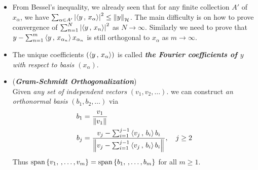 \documentclass[11pt]{article}
\begin{document}
\begin{itemize}
\item \begin{remark}
From Bessel's inequality, we already seen that for any finite collection $A'$ of $x_{\alpha}$, we have $\sum_{\alpha \in A'}\left\lvert \left\langle y\,,\, x_{\alpha} \right\rangle \right\rvert^2 \le \left\|y\right\|_{{\mathcal H}}$. The main difficulty is on how to prove convergence of $\sum_{n=1}^{N}\left\lvert \left\langle y\,,\, x_{n} \right\rangle \right\rvert^2 $ as $N\rightarrow \infty$. Similarly we need to prove that $y-  \sum_{n=1}^{m}\left\langle y\,,\, x_{\alpha_n} \right\rangle x_{\alpha_n}$ is still orthogonal to $x_{\alpha}$ as $m \rightarrow \infty$. 
\end{remark}

\item \begin{remark}
The unique coefficients $(\left\langle y\,,\, x_{\alpha} \right\rangle)$ is called \emph{\textbf{the Fourier coefficients of $y$} with respect to basis $(x_{\alpha})$}.
\end{remark}

\item \begin{remark} (\emph{\textbf{Gram-Schmidt Orthogonalization}})\\
Given \emph{any set of independent vectors} $(v_1, v_2, \ldots)$. we can construct \emph{an orthonormal basis} $(b_1, b_2, \ldots)$ via
\begin{align*}
b_1 &= \frac{v_1}{\left\|v_1\right\|_{}}\\
b_j &= \frac{v_j - \sum_{i=1}^{j-1}\left\langle v_j\,,\, b_i \right\rangle b_i}{\left\|v_j - \sum_{i=1}^{j-1}\left\langle v_j\,,\, b_i \right\rangle b_i\right\|_{}}, \quad j\ge 2
\end{align*} Thus $\text{span}\left\{v_1, \,{,}\ldots{,}\, v_m\right\} = \text{span}\left\{b_1, \,{,}\ldots{,}\, b_m\right\}$ for all $m \ge 1$.
\end{remark}
\end{itemize}
\end{document}
